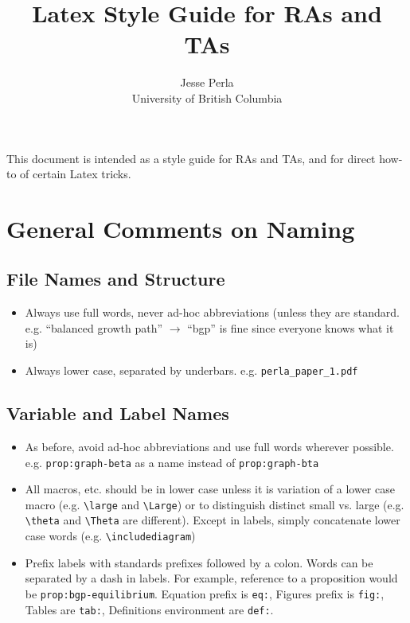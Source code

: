 \documentclass[12pt,etk-draft]{etk-article}
\begin{document}
	\title{Latex Style Guide for RAs and TAs}
	\author{Jesse Perla \\ University of British Columbia}
\date{}

	\maketitle %


This document is intended as a style guide for RAs and TAs, and for direct how-to of certain Latex tricks.	
\section{General Comments on Naming}
\subsection{File Names and Structure}
\begin{itemize}
\item Always use full words, never ad-hoc abbreviations (unless they are standard.  e.g. ``balanced growth path'' $\to$ ``bgp'' is fine since everyone knows what it is)
\item Always lower case, separated by underbars.  e.g. \verb!perla_paper_1.pdf!
\end{itemize}
\subsection{Variable and Label Names}
\begin{itemize}
\item As before, avoid ad-hoc abbreviations and use full words wherever possible.  e.g. \verb!prop:graph-beta! as a name instead of \verb!prop:graph-bta!
\item All macros, etc. should be in lower case unless it is variation of a lower case macro (e.g. \verb!\large! and \verb!\Large!) or to distinguish distinct small vs. large (e.g. \verb!\theta! and \verb!\Theta! are different).  Except in labels, simply concatenate lower case words (e.g. \verb!\includediagram!)
\item Prefix labels with standards prefixes followed by a colon.  Words can be separated by a dash in labels.  For example, reference to a proposition would be \verb!prop:bgp-equilibrium!.  Equation prefix is \verb!eq:!, Figures prefix is \verb!fig:!, Tables are \verb!tab:!, Definitions environment are \verb!def:!.
\end{itemize}
\end{document}
